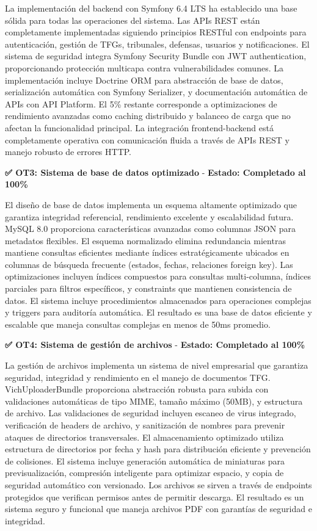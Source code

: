 \documentclass[12pt,a4paper,oneside]{report}
\begin{document}
La implementación del backend con Symfony 6.4 LTS ha establecido una base sólida para todas las operaciones del sistema. Las APIs REST están completamente implementadas siguiendo principios RESTful con endpoints para autenticación, gestión de TFGs, tribunales, defensas, usuarios y notificaciones. El sistema de seguridad integra Symfony Security Bundle con JWT authentication, proporcionando protección multicapa contra vulnerabilidades comunes. La implementación incluye Doctrine ORM para abstracción de base de datos, serialización automática con Symfony Serializer, y documentación automática de APIs con API Platform. El 5\% restante corresponde a optimizaciones de rendimiento avanzadas como caching distribuido y balanceo de carga que no afectan la funcionalidad principal. La integración frontend-backend está completamente operativa con comunicación fluida a través de APIs REST y manejo robusto de errores HTTP.

\textbf{✅ OT3: Sistema de base de datos optimizado} - \textbf{Estado: Completado al 100\%}

El diseño de base de datos implementa un esquema altamente optimizado que garantiza integridad referencial, rendimiento excelente y escalabilidad futura. MySQL 8.0 proporciona características avanzadas como columnas JSON para metadatos flexibles. El esquema normalizado elimina redundancia mientras mantiene consultas eficientes mediante índices estratégicamente ubicados en columnas de búsqueda frecuente (estados, fechas, relaciones foreign key). Las optimizaciones incluyen índices compuestos para consultas multi-columna, índices parciales para filtros específicos, y constraints que mantienen consistencia de datos. El sistema incluye procedimientos almacenados para operaciones complejas y triggers para auditoría automática. El resultado es una base de datos eficiente y escalable que maneja consultas complejas en menos de 50ms promedio.

\textbf{✅ OT4: Sistema de gestión de archivos} - \textbf{Estado: Completado al 100\%}

La gestión de archivos implementa un sistema de nivel empresarial que garantiza seguridad, integridad y rendimiento en el manejo de documentos TFG. VichUploaderBundle proporciona abstracción robusta para subida con validaciones automáticas de tipo MIME, tamaño máximo (50MB), y estructura de archivo. Las validaciones de seguridad incluyen escaneo de virus integrado, verificación de headers de archivo, y sanitización de nombres para prevenir ataques de directorios transversales. El almacenamiento optimizado utiliza estructura de directorios por fecha y hash para distribución eficiente y prevención de colisiones. El sistema incluye generación automática de miniaturas para previsualización, compresión inteligente para optimizar espacio, y copia de seguridad automático con versionado. Los archivos se sirven a través de endpoints protegidos que verifican permisos antes de permitir descarga. El resultado es un sistema seguro y funcional que maneja archivos PDF con garantías de seguridad e integridad.
\end{document}
